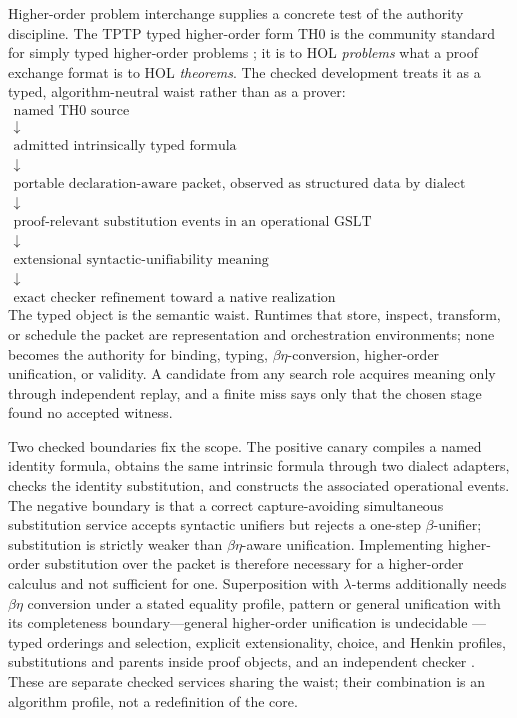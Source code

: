 \documentclass[11pt]{article}
\theoremstyle{definition}
\theoremstyle{remark}
\begin{document}
Higher-order problem interchange supplies a concrete test of the authority
discipline.  The TPTP typed higher-order form TH0 is the community standard
for simply typed higher-order problems \cite{SutcliffeBenzmullerTHF}; it is
to HOL \emph{problems} what a proof exchange format is to HOL \emph{theorems}.
The checked development treats it as a typed, algorithm-neutral waist rather
than as a prover:
\[
\begin{array}{c}
  \text{named TH0 source}\\
  \downarrow\\
  \text{admitted intrinsically typed formula}\\
  \downarrow\\
  \text{portable declaration-aware packet, observed as structured data by
    dialect runtimes}\\
  \downarrow\\
  \text{proof-relevant substitution events in an operational GSLT}\\
  \downarrow\\
  \text{extensional syntactic-unifiability meaning}\\
  \downarrow\\
  \text{exact checker refinement toward a native realization}
\end{array}
\]
The typed object is the semantic waist.  Runtimes that store, inspect,
transform, or schedule the packet are representation and orchestration
environments; none becomes the authority for binding, typing,
$\beta\eta$-conversion, higher-order unification, or validity.  A candidate
from any search role acquires meaning only through independent replay, and a
finite miss says only that the chosen stage found no accepted witness.

Two checked boundaries fix the scope.  The positive canary compiles a named
identity formula, obtains the same intrinsic formula through two dialect
adapters, checks the identity substitution, and constructs the associated
operational events.  The negative boundary is that a correct capture-avoiding
simultaneous substitution service accepts syntactic unifiers but rejects a
one-step $\beta$-unifier; substitution is strictly weaker than
$\beta\eta$-aware unification.  Implementing higher-order substitution over
the packet is therefore necessary for a higher-order calculus and not
sufficient for one.  Superposition with $\lambda$-terms additionally needs
$\beta\eta$ conversion under a stated equality profile, pattern or general
unification with its completeness boundary---general higher-order unification
is undecidable \cite{Huet1975,Goldfarb1981}---typed orderings and selection,
explicit extensionality, choice, and Henkin profiles, substitutions and
parents inside proof objects, and an independent checker
\cite{BentkampSuperpositionLambdas}.  These are separate checked services
sharing the waist; their combination is an algorithm profile, not a
redefinition of the core.
\end{document}
